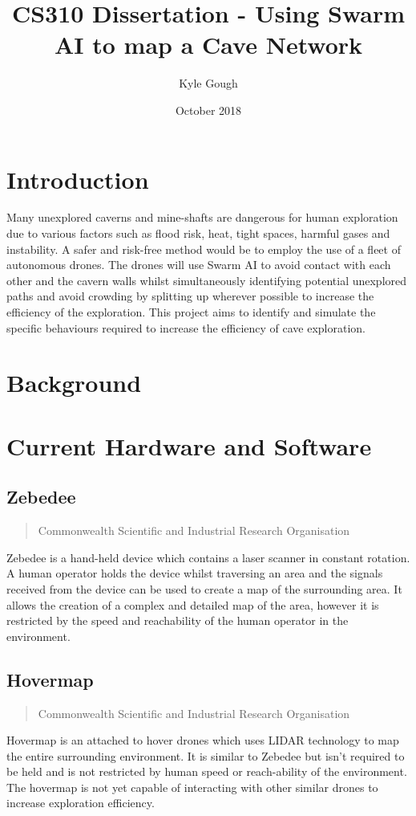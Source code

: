 \documentclass{article}
\title{CS310 Dissertation - Using Swarm AI to map a Cave Network}
\author{Kyle Gough}
\date{October 2018}
\begin{document}
\maketitle

\tableofcontents

\section{Introduction}

Many unexplored caverns and mine-shafts are dangerous for human exploration due to various factors such as flood risk, heat, tight spaces, harmful gases and instability. A safer and risk-free method would be to employ the use of a fleet of autonomous drones. The drones will use Swarm AI to avoid contact with each other and the cavern walls whilst simultaneously identifying potential unexplored paths and avoid crowding by splitting up wherever possible to increase the efficiency of the exploration. This project aims to identify and simulate the specific behaviours required to increase the efficiency of cave exploration.

\section{Background}

\section{Current Hardware and Software}

\subsection*{Zebedee}
\begin{quote}
    Commonwealth Scientific and Industrial Research Organisation
\end{quote}
Zebedee is a hand-held device which contains a laser scanner in constant rotation. A human operator holds the device whilst traversing an area and the signals received from the device can be used to create a map of the surrounding area. It allows the creation of a complex and detailed map of the area, however it is restricted by the speed and reachability of the human operator in the environment.

\subsection*{Hovermap}
\begin{quote}
    Commonwealth Scientific and Industrial Research Organisation
\end{quote}
Hovermap is an attached to hover drones which uses LIDAR technology to map the entire surrounding environment. It is similar to Zebedee but isn't required to be held and is not restricted by human speed or reach-ability of the environment. The hovermap is not yet capable of interacting with other similar drones to increase exploration efficiency.
\end{document}
